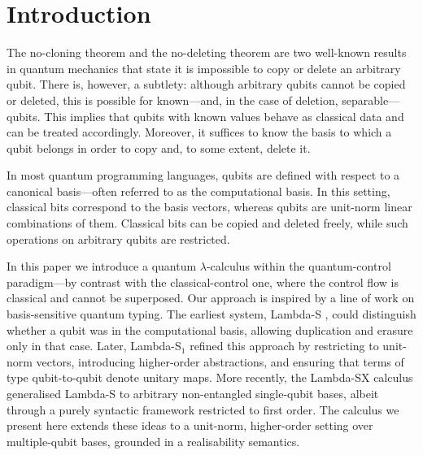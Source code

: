 \documentclass[runningheads,orivec,envcountsame,envcountsect]{llncs}
\begin{document}
\section{Introduction}
The no-cloning theorem \cite{WoottersZurek1982} and the no-deleting theorem
\cite{PatiBraunstein2000} are two well-known results in quantum mechanics that
state it is impossible to copy or delete an arbitrary qubit. 
There is, however, a subtlety: although arbitrary qubits
cannot be copied or deleted, this is possible for known---and, in the case of
deletion, separable---qubits. This implies that qubits with known values behave
as classical data and can be treated accordingly. Moreover, it suffices to know
the basis to which a qubit belongs in order to copy and, to some extent, delete it.

In most quantum programming languages, qubits are defined with respect to a
canonical basis—often referred to as the computational basis. In this setting,
classical bits correspond to the basis vectors, whereas qubits are unit-norm
linear combinations of them. Classical bits can be copied and deleted freely,
while such operations on arbitrary qubits are restricted.

In this paper we introduce a quantum $\lambda$-calculus within the
quantum-control paradigm—by contrast with the classical-control one, where the
control flow is classical and cannot be superposed. Our approach is inspired by
a line of work on basis-sensitive quantum typing. The earliest system,
Lambda-S \cite{DiazcaroDowekRinaldiBIO19}, could distinguish whether a qubit
was in the computational basis, allowing duplication and erasure only in that
case. Later, Lambda-S$_1$
\cite{DiazcaroGuillermoMiquelValironLICS19,DiazCaroMalherbe2022} refined this
approach by restricting to unit-norm vectors, introducing higher-order
abstractions, and ensuring that terms of type qubit-to-qubit denote unitary
maps. More recently, the Lambda-SX calculus \cite{DiazcaroMonzonAPLAS25}
generalised Lambda-S to arbitrary non-entangled single-qubit bases, albeit
through a purely syntactic framework restricted to first order. The calculus we
present here extends these ideas to a unit-norm, higher-order setting over
multiple-qubit bases, grounded in a realisability semantics.
\end{document}
